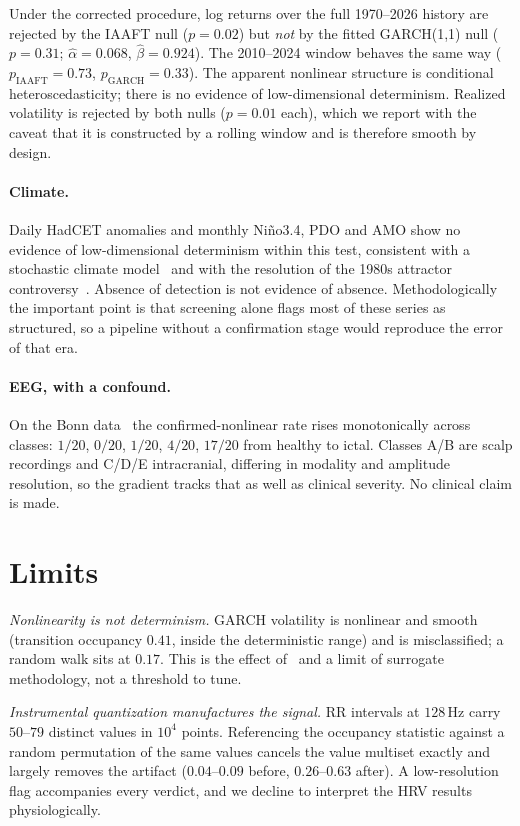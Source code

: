 \documentclass[11pt]{article}
\begin{document}
Under the corrected procedure, log returns over the full 1970--2026 history are
rejected by the IAAFT null ($p=0.02$) but \emph{not} by the fitted GARCH(1,1)
null ($p=0.31$;
$\hat\alpha=0.068$, $\hat\beta=0.924$). The 2010--2024 window behaves the same
way ($p_{\text{IAAFT}}=0.73$, $p_{\text{GARCH}}=0.33$). The apparent nonlinear
structure is conditional heteroscedasticity; there is no evidence of
low-dimensional determinism. Realized volatility is rejected by both nulls
($p=0.01$ each), which we report with the caveat that it is constructed by a
rolling window and is therefore smooth by design.

\paragraph{Climate.} Daily HadCET anomalies and monthly Ni\~no3.4, PDO and AMO
show no evidence of low-dimensional determinism within this test, consistent
with a stochastic climate model~\cite{hasselmann} and with the resolution of the
1980s attractor controversy~\cite{nicolis,grassbergerclimate}. Absence of
detection is not evidence of absence. Methodologically the important point is
that screening alone flags most of these series as structured, so a pipeline
without a confirmation stage would reproduce the error of that era.

\paragraph{EEG, with a confound.} On the Bonn data~\cite{andrzejak} the
confirmed-nonlinear rate rises monotonically across classes: $1/20$, $0/20$,
$1/20$, $4/20$, $17/20$ from healthy to ictal. Classes A/B are scalp recordings
and C/D/E intracranial, differing in modality and amplitude resolution, so the
gradient tracks that as well as clinical severity. No clinical claim is made.

\section{Limits}
\label{sec:limits}

\emph{Nonlinearity is not determinism.} GARCH volatility is nonlinear and
smooth (transition occupancy $0.41$, inside the deterministic range) and is
misclassified; a random walk sits at $0.17$. This is the effect
of~\cite{theiler1986,osborne} and a limit of surrogate methodology, not a
threshold to tune.

\emph{Instrumental quantization manufactures the signal.} RR intervals at
$128$\,Hz carry $50$--$79$ distinct values in $10^4$ points. Referencing the
occupancy statistic against a random permutation of the same values cancels the
value multiset exactly and largely removes the artifact ($0.04$--$0.09$ before,
$0.26$--$0.63$ after). A low-resolution flag accompanies every verdict, and we
decline to interpret the HRV results physiologically.
\end{document}
